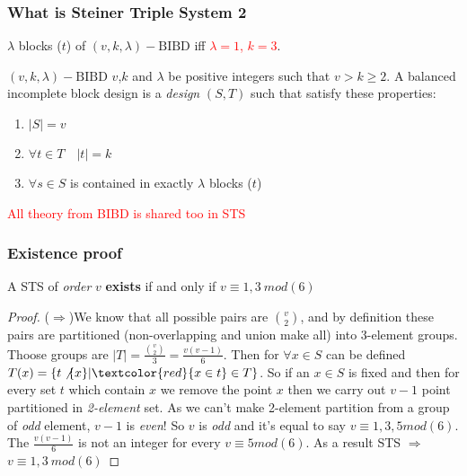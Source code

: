 	\begin{frame}
	\frametitle{What is Steiner Triple System 2}
	
	$\lambda$ blocks ($t$) of $(v,k,\lambda)-\mathrm{BIBD}$ iff \textcolor{red}{$\lambda = 1$, $k=3$}.
	
	\begin{block}{$(v,k,\lambda)-\mathrm{BIBD}$}
		$v$,$k$ and $\lambda$ be positive integers such that $v > k \ge 2$. A balanced incomplete block design is a \textit{design} $(S,T)$ such that satisfy these properties:
		\begin{enumerate}
			\item $|S|=v$
			\item $\forall t \in T\quad |t|= k $
			\item $\forall s \in S$ is contained in exactly $\lambda$ blocks ($t$) 
		\end{enumerate}
	\end{block}
	\pause
	\textcolor{red}{All theory from BIBD is shared too in STS}
	
	\end{frame}


\begin{frame}
	\frametitle{Existence proof}
	\begin{theorem}
		A STS of \textit{order} $v$ \textbf{exists} if and only if $v\equiv 1,3\ mod(6)$  
	\end{theorem}
	\begin{proof}
		($\Rightarrow$)We know that all possible pairs are $\binom{v}{2}$, and by definition these pairs are partitioned (non-overlapping and union make all) into 3-element groups. Thoose groups are $|T|=\frac{\binom{v}{2}}{3}=\frac{v(v-1)}{6}$. Then for $\forall x \in S$ can be defined $T(x) = \{ t\not\{x\} | \textcolor{red}{x \in t} \in T \}$. So if an $x \in S$ is fixed and then for every set $t$ which contain $x$ we remove the point $x$ then we carry out $v-1$ point partitioned in \textit{2-element} set. As we can't make 2-element partition from a group of \textit{odd} element, $v-1$ is \textit{even}! So $v$ is \textit{odd} and it's equal to say $v \equiv 1,3,5 mod(6)$. The $\frac{v(v-1)}{6}$ is not an integer for every $v \equiv 5 mod(6)$. As a result STS $\Rightarrow$ $v\equiv 1,3\ mod(6)$
	\end{proof}
\end{frame}

